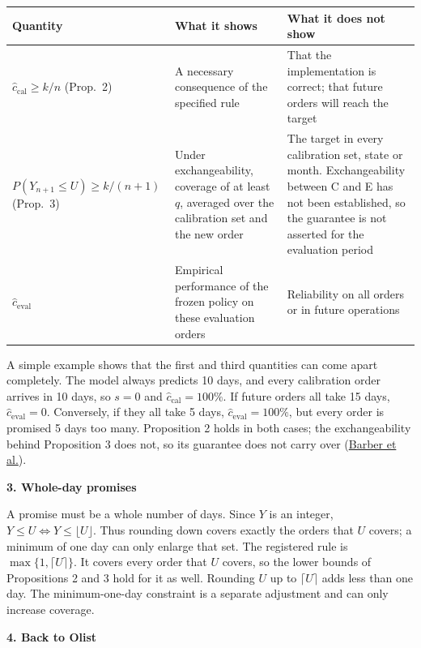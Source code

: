 \documentclass[11pt]{article}
\newcommand{\1}{\mathbf 1}
\begin{document}
\begin{center}
\small
\begin{tabular}{>{\raggedright\arraybackslash}p{}>{\raggedright\arraybackslash}p{}>{\raggedright\arraybackslash}p{}}
\toprule
Quantity & What it shows & What it does not show\\
\midrule
\(\hat c_{\mathrm{cal}}\ge k/n\) (Prop.~2) & A necessary consequence of the specified rule & That the implementation is correct; that future orders will reach the target\\
\(P(Y_{n+1}\le U)\ge k/(n+1)\) (Prop.~3) & Under exchangeability, coverage of at least \(q\), averaged over the calibration set and the new order & The target in every calibration set, state or month. Exchangeability between C and E has not been established, so the guarantee is not asserted for the evaluation period\\
\(\hat c_{\mathrm{eval}}\) & Empirical performance of the frozen policy on these evaluation orders & Reliability on all orders or in future operations\\
\bottomrule
\end{tabular}
\end{center}

A simple example shows that the first and third quantities can come apart completely. The model always predicts 10 days, and every calibration order arrives in 10 days, so \(s=0\) and \(\hat c_{\mathrm{cal}}=100\%\). If future orders all take 15 days, \(\hat c_{\mathrm{eval}}=0\). Conversely, if they all take 5 days, \(\hat c_{\mathrm{eval}}=100\%\), but every order is promised 5 days too many. Proposition 2 holds in both cases; the exchangeability behind Proposition 3 does not, so its guarantee does not carry over (\href{https://arxiv.org/abs/2202.13415}{Barber et al.}).

\bigskip
\textbf{3. Whole-day promises}

A promise must be a whole number of days. Since \(Y\) is an integer, \(Y\le U\iff Y\le\lfloor U\rfloor\). Thus rounding down covers exactly the orders that \(U\) covers; a minimum of one day can only enlarge that set. The registered rule is \(\max\{1,\lceil U\rceil\}\). It covers every order that \(U\) covers, so the lower bounds of Propositions 2 and 3 hold for it as well. Rounding \(U\) up to \(\lceil U\rceil\) adds less than one day. The minimum-one-day constraint is a separate adjustment and can only increase coverage.

\bigskip
\textbf{4. Back to Olist}
\end{document}
